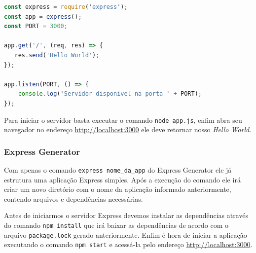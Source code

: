 \documentclass[
	12pt,				%
	openright,			%
	twoside,			%
	a4paper,			%
	english,			%
	brazil				%
	]{abntex2}
\begin{document}
\begin{lstlisting}[language=javascript]
const express = require('express');
const app = express();
const PORT = 3000;

app.get('/', (req, res) => {
   res.send('Hello World');
});

app.listen(PORT, () => {
    console.log('Servidor disponivel na porta ' + PORT);
});
\end{lstlisting}

Para iniciar o servidor basta executar o comando \verb|node app.js|, enfim abra seu navegador no endereço \href{http://localhost:3000}{http://localhost:3000} ele deve retornar nosso \textit{Hello World}.

\subsubsection{Express Generator}

Com apenas o comando \verb|express nome_da_app| do Express Generator ele já estrutura uma aplicação Express simples. Após a execução do comando ele irá criar um novo diretório com o nome da aplicação informado anteriormente, contendo arquivos e dependências necessárias. 

Antes de iniciarmos o servidor Express devemos instalar as dependências através do comando \verb|npm install| que irá baixar as dependências de acordo com o arquivo \verb|package.lock| gerado anteriormente. Enfim é hora de iniciar a aplicação executando o comando \verb|npm start| e acessá-la pelo endereço \href{http://localhost:3000}{http://localhost:3000}.
\end{document}
